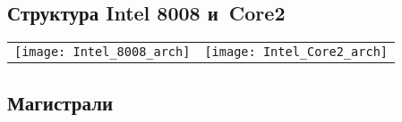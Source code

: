 
\subsection{%
Структура
Intel 8008
и~Core2}

\begin{tabularx}{1\linewidth}{@{}l@{\,}l@{}}


\texttt{[image: Intel\_8008\_arch]}\centering
&

\texttt{[image: Intel\_Core2\_arch]}
\end{tabularx}



\subsection{Магистрали}
% 
% 


\resizebox{0.8\linewidth}{!}{

}
